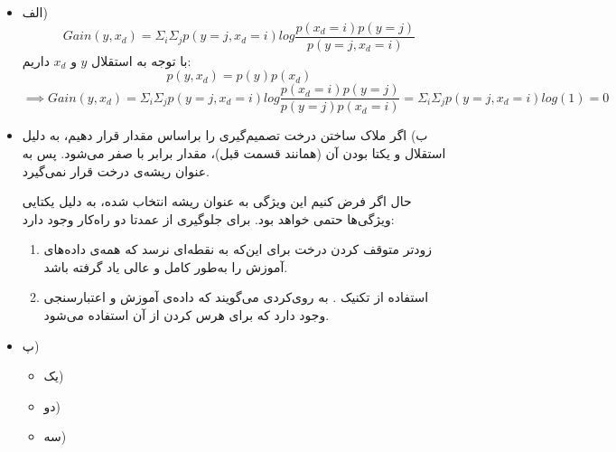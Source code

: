 
\begin{itemize}
	\item الف)
	$$
	Gain(y, x_d) = \Sigma_{i}\Sigma_{j} p(y=j, x_d=i) log \frac{p(x_d=i)p(y=j)}{p(y=j, x_d=i)}
	$$
	با توجه به استقلال $y$ و $x_d$ داریم:
	$$
	p(y, x_d) = p(y)p(x_d)
	$$
	$$
	\implies Gain(y, x_d) = \Sigma_{i}\Sigma_{j} p(y=j, x_d=i) log \frac{p(x_d=i)p(y=j)}{p(y=j)p(x_d=i)}
	= \Sigma_{i}\Sigma_{j} p(y=j, x_d=i) log(1) = 0$$ 
	\item ب)
	اگر ملاک ساختن درخت تصمیم‌گیری را براساس مقدار  قرار دهیم، به دلیل استقلال و یکتا بودن آن (همانند قسمت قبل)، مقدار  برابر با صفر می‌شود. پس به عنوان ریشه‌ی درخت قرار نمی‌گیرد. 
	
	حال اگر فرض کنیم این ویژگی به عنوان ریشه انتخاب شده،  به دلیل یکتایی ویژگی‌ها حتمی خواهد بود. برای جلوگیری از  عمدتا دو راه‌کار وجود دارد:
	\begin{enumerate}
		\item زودتر متوقف کردن درخت برای  این‌که به نقطه‌ای نرسد که همه‌ی داده‌های آموزش را به‌طور کامل و عالی یاد گرفته باشد.
		\item استفاده از تکنیک . به روی‌کردی می‌گویند که داده‌ی آموزش و اعتبارسنجی وجود دارد که برای هرس کردن از آن استفاده می‌شود.
	\end{enumerate}
	\item پ)
	\begin{itemize}
		\item یک)
		\item دو)
		\item سه)
	\end{itemize}
\end{itemize}